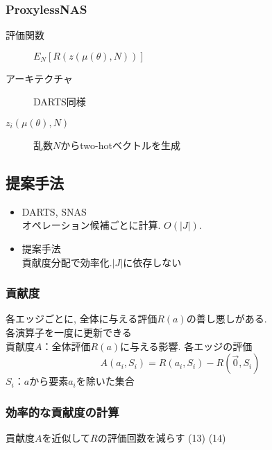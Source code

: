 \documentclass[twocolumn]{jarticle}     %
\begin{document}
\subsubsection{ProxylessNAS}
\begin{description}
  \item[評価関数] $E_N [R(z(\mu(\theta), N))]$
  \item[アーキテクチャ] DARTS同様
  \item[$z_i(\mu(\theta), N)$] 乱数$N$からtwo-hotベクトルを生成
\end{description}



\subsection{提案手法}
\begin{itemize}
  \item DARTS, SNAS\\オペレーション候補ごとに計算. $O(|J|)$.
  \item 提案手法\\貢献度分配で効率化.$|J|$に依存しない
\end{itemize}

\subsubsection{貢献度}
各エッジごとに, 全体に与える評価$R(a)$の善し悪しがある.\\
各演算子を一度に更新できる\\
貢献度$A$：全体評価$R(a)$に与える影響. 各エッジの評価
\[A(a_i, S_i) = R(a_i, S_i) - R(\vec{0}, S_i)\]
$S_i$：$a$から要素$a_i$を除いた集合

\subsubsection{効率的な貢献度の計算}
貢献度$A$を近似して$R$の評価回数を減らす
(13)
(14)
\end{document}
